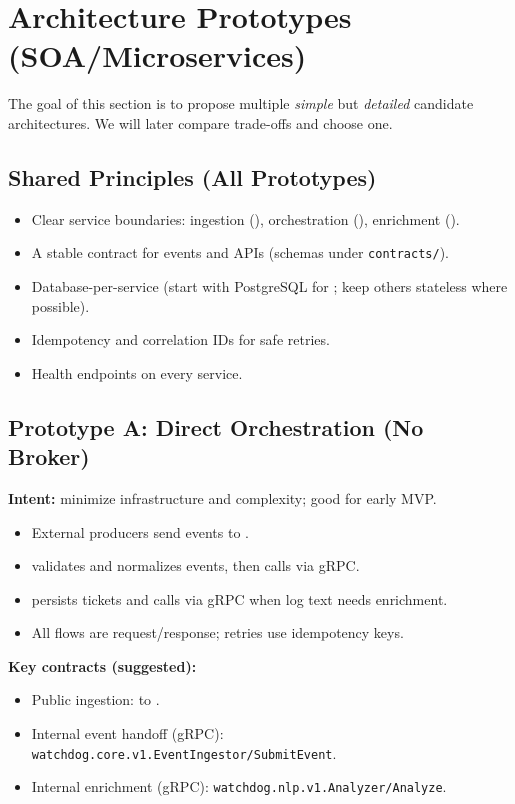 \section{Architecture Prototypes (SOA/Microservices)}

The goal of this section is to propose multiple \emph{simple} but \emph{detailed} candidate architectures.
We will later compare trade-offs and choose one.

\subsection{Shared Principles (All Prototypes)}
\begin{itemize}
  \item Clear service boundaries: ingestion (), orchestration (), enrichment ().
  \item A stable contract for events and APIs (schemas under \texttt{contracts/}).
  \item Database-per-service (start with PostgreSQL for ; keep others stateless where possible).
  \item Idempotency and correlation IDs for safe retries.
  \item Health endpoints on every service.
\end{itemize}

\subsection{Prototype A: Direct Orchestration (No Broker)}
\textbf{Intent:} minimize infrastructure and complexity; good for early MVP.

\begin{itemize}
  \item External producers send events to .
  \item {} validates and normalizes events, then calls  via gRPC.
  \item {} persists tickets and calls  via gRPC when log text needs enrichment.
  \item All flows are request/response; retries use idempotency keys.
\end{itemize}

\textbf{Key contracts (suggested):}
\begin{itemize}
  \item Public ingestion:  to .
  \item Internal event handoff (gRPC): \texttt{watchdog.core.v1.EventIngestor/SubmitEvent}.
  \item Internal enrichment (gRPC): \texttt{watchdog.nlp.v1.Analyzer/Analyze}.
\end{itemize}

